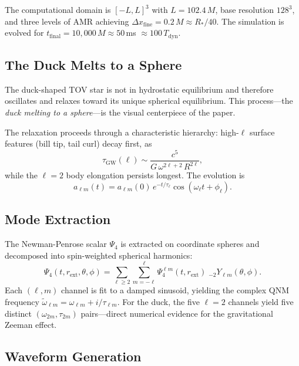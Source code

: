 \documentclass[aps,prd,twocolumn,superscriptaddress,nofootinbib]{revtex4-2}
\begin{document}
The computational domain is $[-L, L]^3$ with $L = 102.4\,M$, base
resolution $128^3$, and three levels of AMR achieving
$\Delta x_{\mathrm{fine}} = 0.2\,M \approx R_*/40$.
The simulation is evolved for $t_{\mathrm{final}} = 10{,}000\,M \approx
50\,$ms $\approx 100\,T_{\mathrm{dyn}}$.


\subsection{The Duck Melts to a Sphere}
\label{sec:duck_melts}

The duck-shaped TOV star is not in hydrostatic equilibrium and therefore
oscillates and relaxes toward its unique spherical equilibrium.
This process---the \textit{duck melting to a sphere}---is the visual
centerpiece of the paper.

The relaxation proceeds through a characteristic hierarchy:
high-$\ell$ surface features (bill tip, tail curl) decay first, as
\begin{equation}
\tau_{\mathrm{GW}}(\ell) \sim \frac{c^5}{G\,\omega^{2\ell+2}\,R^{2\ell}},
\end{equation}
while the $\ell = 2$ body elongation persists longest.
The evolution is
\begin{equation}
a_{\ell m}(t) = a_{\ell m}(0)\,e^{-t/\tau_\ell}\cos(\omega_\ell t +
\phi_\ell).
\end{equation}


\subsection{Mode Extraction}
\label{sec:mode_extraction}

The Newman-Penrose scalar $\Psi_4$ is extracted on coordinate spheres and
decomposed into spin-weighted spherical harmonics:
\begin{equation}
\Psi_4(t, r_{\mathrm{ext}}, \theta, \phi) = \sum_{\ell \geq 2}
\sum_{m=-\ell}^{\ell} \Psi_4^{\ell m}(t, r_{\mathrm{ext}})\;
{}_{-2}Y_{\ell m}(\theta, \phi).
\end{equation}
Each $(\ell, m)$ channel is fit to a damped sinusoid, yielding the complex
QNM frequency $\tilde{\omega}_{\ell m} = \omega_{\ell m} +
i/\tau_{\ell m}$.
For the duck, the five $\ell = 2$ channels yield five distinct
$(\omega_{2m}, \tau_{2m})$ pairs---direct numerical evidence for the
gravitational Zeeman effect.


\subsection{Waveform Generation}
\label{sec:waveform_gen}
\end{document}
